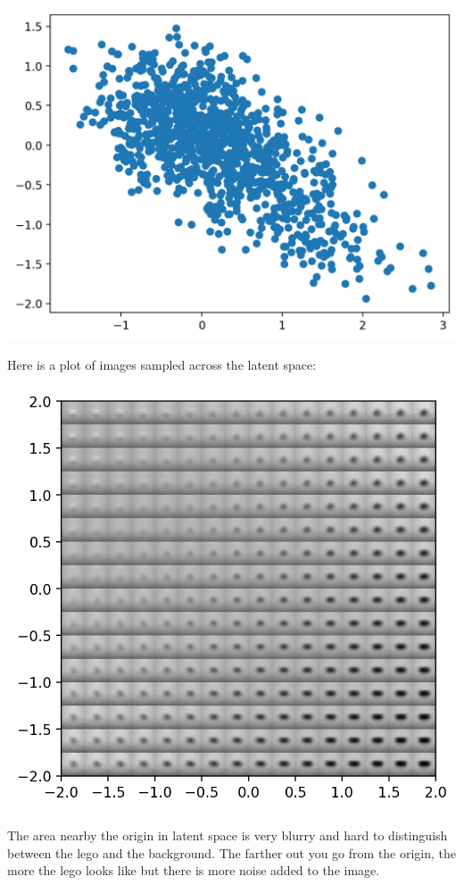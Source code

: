 \documentclass{article}
\begin{document}
\begin{center}
  \includegraphics[scale=0.75]{latent_space-lego-dataset}
\end{center}

Here is a plot of images sampled across the latent space:

\begin{center}
  \includegraphics[scale=1]{latent_space_examples-lego-dataset}
\end{center}

The area nearby the origin in latent space is very blurry and hard
to distinguish between the lego and the background. The farther
out you go from the origin, the more the lego looks like but
there is more noise added to the image.
\end{document}
